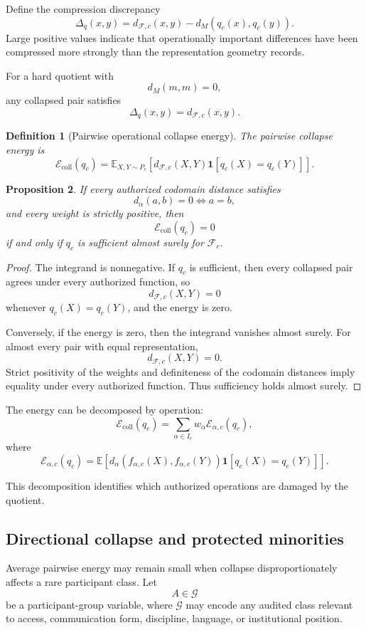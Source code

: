 \documentclass[11pt]{article}
\newtheorem{definition}{Definition}[section]
\newtheorem{proposition}[definition]{Proposition}
\theoremstyle{definition}
\newcommand{\E}{\mathbb{E}}
\newcommand{\F}{\mathcal{F}}
\newcommand{\ind}{\mathbf{1}}
\begin{document}
Define the compression discrepancy
\[
\Delta_q(x,y)
=
d_{\F,c}(x,y)
-
d_M(q_c(x),q_c(y)).
\]
Large positive values indicate that operationally important differences have been compressed more strongly than the representation geometry records.

For a hard quotient with
\[
d_M(m,m)=0,
\]
any collapsed pair satisfies
\[
\Delta_q(x,y)
=
d_{\F,c}(x,y).
\]

\begin{definition}[Pairwise operational collapse energy]
The pairwise collapse energy is
\[
\mathcal E_{\mathrm{coll}}(q_c)
=
\E_{X,Y\sim P_c}
\left[
d_{\F,c}(X,Y)
\ind[q_c(X)=q_c(Y)]
\right].
\]
\end{definition}

\begin{proposition}
If every authorized codomain distance satisfies
\[
d_\alpha(a,b)=0
\iff
a=b,
\]
and every weight is strictly positive, then
\[
\mathcal E_{\mathrm{coll}}(q_c)=0
\]
if and only if \(q_c\) is sufficient almost surely for \(\F_c\).
\end{proposition}

\begin{proof}
The integrand is nonnegative. If \(q_c\) is sufficient, then every collapsed pair agrees under every authorized function, so
\[
d_{\F,c}(X,Y)=0
\]
whenever \(q_c(X)=q_c(Y)\), and the energy is zero.

Conversely, if the energy is zero, then the integrand vanishes almost surely. For almost every pair with equal representation,
\[
d_{\F,c}(X,Y)=0.
\]
Strict positivity of the weights and definiteness of the codomain distances imply equality under every authorized function. Thus sufficiency holds almost surely.
\end{proof}

The energy can be decomposed by operation:
\[
\mathcal E_{\mathrm{coll}}(q_c)
=
\sum_{\alpha\in I_c}
w_\alpha
\mathcal E_{\alpha,c}(q_c),
\]
where
\[
\mathcal E_{\alpha,c}(q_c)
=
\E
\left[
d_\alpha
\left(
f_{\alpha,c}(X),
f_{\alpha,c}(Y)
\right)
\ind[q_c(X)=q_c(Y)]
\right].
\]

This decomposition identifies which authorized operations are damaged by the quotient.

\subsection{Directional collapse and protected minorities}

Average pairwise energy may remain small when collapse disproportionately affects a rare participant class. Let
\[
A\in\mathcal G
\]
be a participant-group variable, where \(\mathcal G\) may encode any audited class relevant to access, communication form, discipline, language, or institutional position.
\end{document}
